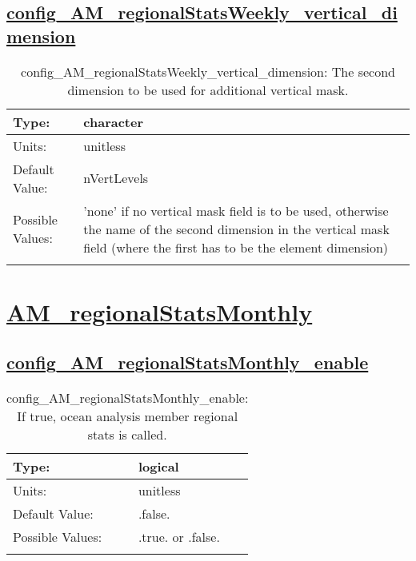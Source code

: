 \subsection[config\_AM\_regionalStatsWeekly\_vertical\_dimension]{\hyperref[sec:nm_tab_AM_regionalStatsWeekly]{config\_AM\_regionalStatsWeekly\_vertical\_dimension}}
\label{subsec:nm_sec_config_AM_regionalStatsWeekly_vertical_dimension}
\begin{center}
\begin{longtable}{| p{2.0in} || p{4.0in} |}
    \hline
    Type: & character \\
    \hline
    Units: & \si{unitless} \\
    \hline
    Default Value: & nVertLevels \\
    \hline
    Possible Values: & 'none' if no vertical mask field is to be used, otherwise the name of the second dimension in the vertical mask field (where the first has to be the element dimension) \\
    \hline
    \caption{config\_AM\_regionalStatsWeekly\_vertical\_dimension: The second dimension to be used for additional vertical mask.}
\end{longtable}
\end{center}
\section[AM\_regionalStatsMonthly]{\hyperref[sec:nm_tab_AM_regionalStatsMonthly]{AM\_regionalStatsMonthly}}
\label{sec:nm_sec_AM_regionalStatsMonthly}
\subsection[config\_AM\_regionalStatsMonthly\_enable]{\hyperref[sec:nm_tab_AM_regionalStatsMonthly]{config\_AM\_regionalStatsMonthly\_enable}}
\label{subsec:nm_sec_config_AM_regionalStatsMonthly_enable}
\begin{center}
\begin{longtable}{| p{2.0in} || p{4.0in} |}
    \hline
    Type: & logical \\
    \hline
    Units: & \si{unitless} \\
    \hline
    Default Value: & .false. \\
    \hline
    Possible Values: & .true. or .false. \\
    \hline
    \caption{config\_AM\_regionalStatsMonthly\_enable: If true, ocean analysis member regional stats is called.}
\end{longtable}
\end{center}

